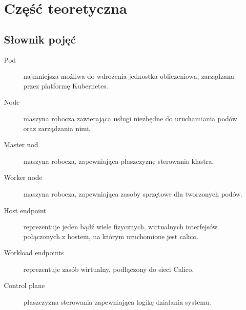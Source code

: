\documentclass[pl,final,oneside]{mgr} %
\begin{document}
\chapter{Część teoretyczna}
\section{Słownik pojęć}
\begin{description}
\item[Pod] najmniejsza możliwa do wdrożenia jednostka obliczeniowa, zarządzana przez platformę Kubernetes.
\item[Node] maszyna robocza zawierająca usługi niezbędne do uruchamiania podów oraz zarządzania nimi.
\item[Master nod] maszyna robocza, zapewniająca płaszczyznę sterowania klastra.
\item[Worker node] maszyna robocza, zapewniająca zasoby sprzętowe dla tworzonych podów.
\item[Host endpoint] reprezentuje jeden bądź wiele fizycznych, wirtualnych interfejsów połączonych z hostem, na którym uruchomione jest calico.
\item[Workload endpoints] reprezentuje zasób wirtualny, podłączony do sieci Calico.
\item[Control plane] płaszczyzna sterowania zapewniająca logikę działania systemu.
\end{description}
\end{document}
